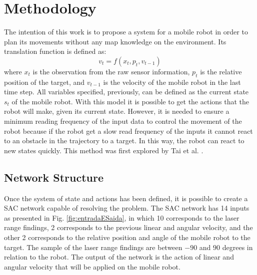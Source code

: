 \section{Methodology}

The intention of this work is to propose a system for a mobile robot in order to plan its movements without any map knowledge on the environment. Its translation function is defined as:
\begin{equation}
v_t = f(x_t, p_t, v_{t-1})
\end{equation}
where $x_t$ is the observation from the raw sensor information, $p_t$ is the relative position of the target, and $v_{t-1}$ is the velocity of the mobile robot in the last time step.
All variables specified, previously, can be defined as the current state $s_t$ of the mobile robot.
With this model it is possible to get the actions that the robot will make, given its current state.
However, it is needed to ensure a minimum reading frequency of the input data to control the movement of the robot because if the robot get a slow read frequency of the inputs it cannot react to an obstacle in the trajectory to a target. In this way, the robot can react to new states quickly.
This method was first explored by Tai et al. \cite{tai2017virtual}.

\subsection{Network Structure}

Once the system of state and actions has been defined, it is possible to create a SAC network capable of resolving the problem.
The SAC network has 14 inputs as presented in Fig. \ref{fig:entradaESaida}, in which 10 corresponds to the laser range findings, 2 corresponds to the previous linear and angular velocity, and the other 2 corresponds to the relative position and angle of the mobile robot to the target.
The sample of the laser range findings are between $-90$ and $90$ degrees in relation to the robot. The output of the network is the action of linear and angular velocity that will be applied on the mobile robot.

